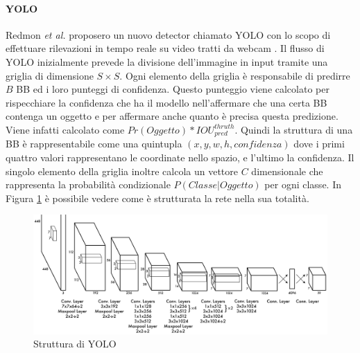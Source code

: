 \paragraph{YOLO}
Redmon \textit{et al.} proposero un nuovo detector chiamato \ac{YOLO} con lo scopo di effettuare rilevazioni in tempo reale su video tratti da webcam \cite{redmon2016you}. 
Il flusso di \ac{YOLO} inizialmente prevede la divisione dell'immagine in input tramite una griglia di dimensione $S \times S$. 
Ogni elemento della griglia è responsabile di predirre $B$ \ac{BB} ed i loro punteggi di confidenza. Questo punteggio viene calcolato per rispecchiare la confidenza che ha il modello nell'affermare che una certa \ac{BB} contenga un oggetto e per affermare anche quanto è precisa questa predizione. Viene infatti calcolato come $Pr(Oggetto) * IOU^{thruth}_{pred}$.
Quindi la struttura di una \ac{BB} è rappresentabile come una quintupla $(x, y, w, h, confidenza)$ dove i primi quattro valori rappresentano le coordinate nello spazio, e l'ultimo la confidenza. 
Il singolo elemento della griglia inoltre calcola un vettore $C$ dimensionale che rappresenta la probabilità condizionale $P(Classe | Oggetto)$ per ogni classe. In Figura \ref{fig:yolo_structure} è possibile vedere come è strutturata la rete nella sua totalità. 
\begin{figure}[]
    \centering
    \includegraphics[width=\textwidth]{images/net_yolo.pdf}
    \caption{Struttura di \ac{YOLO} \cite{redmon2016you}}
    \label{fig:yolo_structure}
\end{figure}
